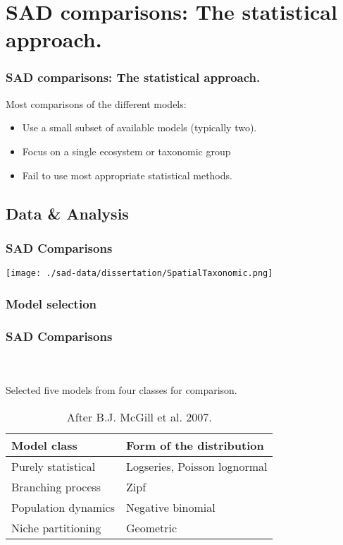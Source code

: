 \documentclass[14pt]{beamer}
\begin{document}
\section{SAD comparisons: The statistical approach.}
\begin{frame}
\frametitle{SAD comparisons: The statistical approach.}
\begin{large}
Most comparisons of the different models:
\end{large}
\begin{itemize}
\item Use a small subset of available models (typically two).
\item Focus on a single ecosystem or taxonomic group
\item Fail to use most appropriate statistical methods. 
\end{itemize}
\end{frame}

\subsection{Data & Analysis}
\begin{frame}
\frametitle{SAD Comparisons}
\begin{center}
\texttt{[image: ./sad-data/dissertation/SpatialTaxonomic.png]}
\end{center}
\end{frame}

\subsubsection{Model selection}
\begin{frame}[shrink=10]
\frametitle{SAD Comparisons}
~\\
~\\
Selected five models from four classes for comparison.
\begin{table}
\begin{tabular}{l|l}
 Model class & Form of the distribution\\ 
\hline
 Purely statistical & Logseries, Poisson lognormal\\
 Branching process & Zipf \\
 Population dynamics & Negative binomial\\
 Niche partitioning & Geometric \\
\end{tabular}
~\\
~\\
~\\
~\\
\caption{After B.J. McGill et al. 2007.}
\end{table}
\end{frame}
\end{document}
